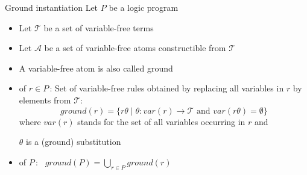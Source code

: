 \begin{frame}{Ground instantiation}
  Let $P$ be a logic program
  \begin{itemize}
  \item<1-> Let $\mathcal{T}$ be a set of variable-free \alert<1-2>{terms}
  \item<1-> Let $\mathcal{A}$ be a set of variable-free \alert<1-2>{atoms} constructible from $\mathcal{T}$
    \smallskip
  \item<4-> A variable-free atom is also called \alert{ground}
    \medskip
  \item<5->  of $r\in P$\,: Set of variable-free rules obtained by
    replacing all variables in $r$ by elements from $\mathcal{T}$:
    \[
    \mathit{ground}(r)=\{r\theta\mid\theta:\mathit{var}(r)\rightarrow \mathcal{T} \text{ and } \mathit{var}(r\theta)=\emptyset\}
    \]
    where $\mathit{var}(r)$ stands for the set of all variables occurring in $r$ and

    $\theta$ is a (ground) substitution
    \medskip
  \item<6->  of $P$\,: \
    \(
    \mathit{ground}(P)=\textstyle\bigcup_{r\in P}\mathit{ground}(r)
    \)
  \end{itemize}
\end{frame}
